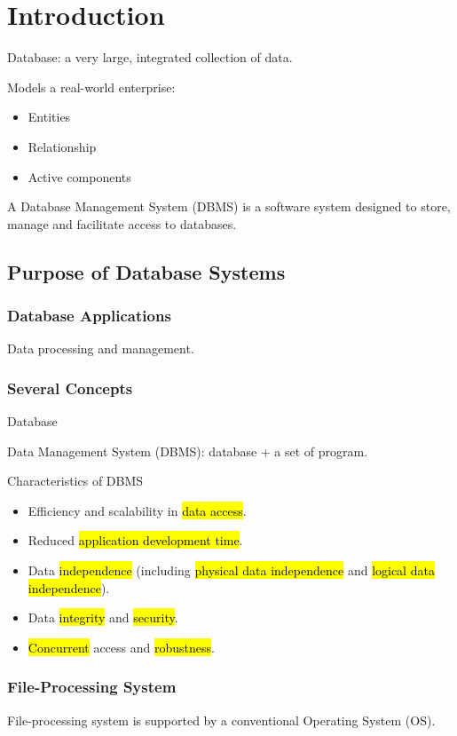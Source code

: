 \newpage
\section{Introduction}
Database: a very large, integrated collection of data. 

Models a real-world enterprise: 
\begin{itemize}
    \item Entities
    \item Relationship
    \item Active components
\end{itemize}

A Database Management System (DBMS) is a software system designed to store, manage and facilitate access to databases. 

\subsection{Purpose of Database Systems}

\subsubsection{Database Applications}
Data processing and management. 

\subsubsection{Several Concepts}
Database

Data Management System (DBMS): database + a set of program. 

Characteristics of DBMS
\begin{itemize}
    \item Efficiency and scalability in \hl{data access}. 
    \item Reduced \hl{application development time}. 
    \item Data \hl{independence} (including \hl{physical data independence} and \hl{logical data independence}).
    \item Data \hl{integrity} and \hl{security}. 
    \item \hl{Concurrent} access and \hl{robustness}. 
\end{itemize}

\subsubsection{File-Processing System}
File-processing system is supported by a conventional Operating System (OS). 

